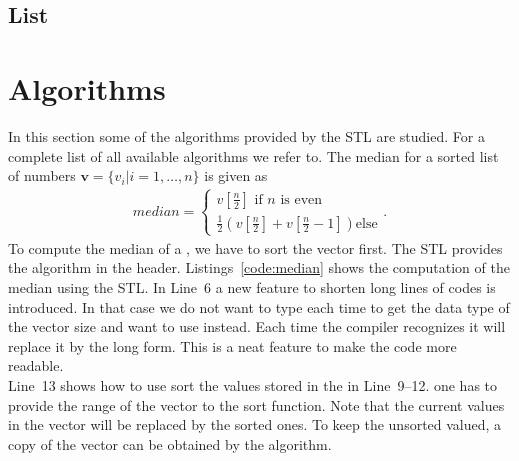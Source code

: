 \subsection{List}

\section{Algorithms}
\label{sec:stl:algorithms}
In this section some of the algorithms provided by the STL are studied. For a complete list of all available algorithms we refer to. The median for a sorted list of numbers $\mathbf{v}=\{v_i \vert i =1,\ldots,n\}$ is given as
\begin{align}
median = \begin{cases}
v[\frac{n}{2}] \text{ if } n \text{ is even} \\
\frac{1}{2}\left( v[\frac{n}{2}] + v[\frac{n}{2}-1] \right) \text{else}
\end{cases} \text{.}
\end{align}
To compute the median of a , we have to sort the vector first. The STL provides the  algorithm in the  header. Listings~\ref{code:median} shows the computation of the median using the STL. In Line~6 a new feature  to shorten long lines of codes is introduced. In that case we do not want to type each time  to get the data type of the vector size and want to use  instead. Each time the compiler recognizes  it will replace it by the long form. This is a neat feature to make the code more readable.\\

Line~13 shows how to use sort the values stored in the  in Line~9--12. one has to provide the range of the vector to the sort function. Note that the current values in the vector will be replaced by the sorted ones. To keep the unsorted valued, a copy of the vector can be obtained by the  algorithm.\\

